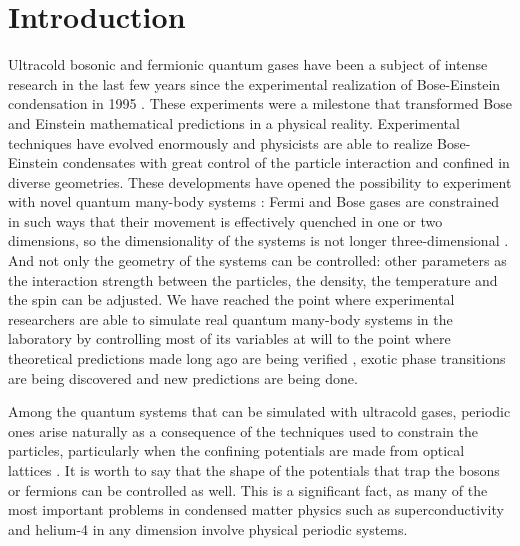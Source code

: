 \chapter{Introduction}%
\label{sec:introduccion}

Ultracold bosonic and fermionic quantum gases have been a subject of intense
research in the last few years since the experimental realization of
Bose-Einstein condensation in 1995 \cite{bib:anderson-science.269.1995,
  bib:davis-phys.rev.A.75.3969.1995}. These experiments were a milestone that
transformed Bose and Einstein \cite{bib:einstein-1924-quantentheorie}
mathematical predictions in a physical reality. Experimental techniques have
evolved enormously and physicists are able to realize Bose-Einstein condensates
with great control of the particle interaction and confined in diverse
geometries. These developments have opened the possibility to experiment with
novel quantum many-body systems \cite{bib:takasu-et-al-phys-rev-lett.91.040404,
  bib:schreck-f-et-al-phys-rev-lett.87.080403}: Fermi and Bose gases are
constrained in such ways that their movement is effectively quenched in one or
two dimensions, so the dimensionality of the systems is not longer
three-dimensional \cite{bib:a-gorlitz-phys-rev-lett.87.130402}. And not only the
geometry of the systems can be controlled: other parameters as the interaction
strength between the particles, the density, the temperature and the spin can be
adjusted. We have reached the point where experimental researchers are able to
simulate \cite{bib:bloch-nature-physics.2012} real quantum many-body systems in
the laboratory by controlling most of its variables at will to the point where
theoretical predictions made long ago are being verified
\cite{bib:tonks-phys-rev.50.955.1936, bib:girardeau-j-math-phys.1960,
  bib:paredes-bloch-et-al-nature.419.2014}, exotic phase transitions are being
discovered and new predictions are being done.

Among the quantum systems that can be simulated with ultracold gases, periodic
ones arise naturally as a consequence of the techniques used to constrain the
particles, particularly when the confining potentials are made from optical
lattices \cite{bib:bloch-nature-phys.2005}. It is worth to say that the shape of
the potentials that trap the bosons or fermions can be controlled as well. This
is a significant fact, as many of the most important problems in condensed
matter physics such as superconductivity
\cite{bib:bednorz-et-al-phys-b-cond-matt.1986, bib:phys-rev-B.50.4260,
  bib:norman-pepin-rep-prog-phys.2003} and helium-4 in any dimension
\cite{bib:phys-rev-lett.71.3673, bib:j-phys-soc-jpn.77.111011} involve physical
periodic systems.

